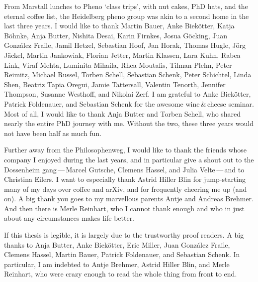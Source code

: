 From Marstall lunches to Pheno `class trips', with nut cakes, PhD
hats, and the eternal coffee list, the Heidelberg pheno group was akin
to a second home in the last three years. I would like to thank Martin
Bauer, Anke Biek\"otter, Katja B\"ohnke, Anja Butter, Nishita Desai,
Karin Firnkes, Josua G\"ocking, Juan Gonz\'alez Fraile, Jamil Hetzel,
Sebastian Hoof, Jan Horak, Thomas Hugle, J\"org J\"ackel, Martin
Jankowiak, Florian Jetter, Martin Klassen, Lara Kuhn, Rabea Link,
Viraf Mehta, Luminita Mihaila, Rhea Moutafis, Tilman Plehn, Peter
Reimitz, Michael Russel, Torben Schell, Sebastian Schenk, Peter
Schichtel, Linda Shen, Beatriz Tapia Oregui, Jamie Tattersall,
Valentin Tenorth, Jennifer Thompson, Susanne Westhoff, and Nikolai
Zerf. I am grateful to Anke Biek\"otter, Patrick Foldenauer, and
Sebastian Schenk for the awesome wine\,\&\,cheese seminar. Most of
all, I would like to thank Anja Butter and Torben Schell, who shared
nearly the entire PhD journey with me. Without the two, these three
years would not have been half as much fun.

Further away from the Philosophenweg, I would like to thank the
friends whose company I enjoyed during the last years, and in
particular give a shout out to the Dossenheim gang\,---\,Marcel
Gutsche, Clemens Hassel, and Julia Velte\,---\,and to Christina
Eilers. I want to especially thank Astrid Hiller Blin for
jump-starting many of my days over coffee and arXiv, and for frequently
cheering me up (and on). A big thank you goes to my marvellous parents
Antje and Andreas Brehmer. And then there is Merle Reinhart, who I
cannot thank enough and who in just about any circumstances makes life
better.

If this thesis is legible, it is largely due to the trustworthy
proof readers. A big thanks to Anja Butter, Anke Biek\"otter, Eric
Miller, Juan Gonz\'alez Fraile, Clemens Hassel, Martin Bauer, Patrick
Foldenauer, and Sebastian Schenk. In particular, I am indebted to
Antje Brehmer, Astrid Hiller Blin, and Merle Reinhart, who were crazy
enough to read the whole thing from front to end.


